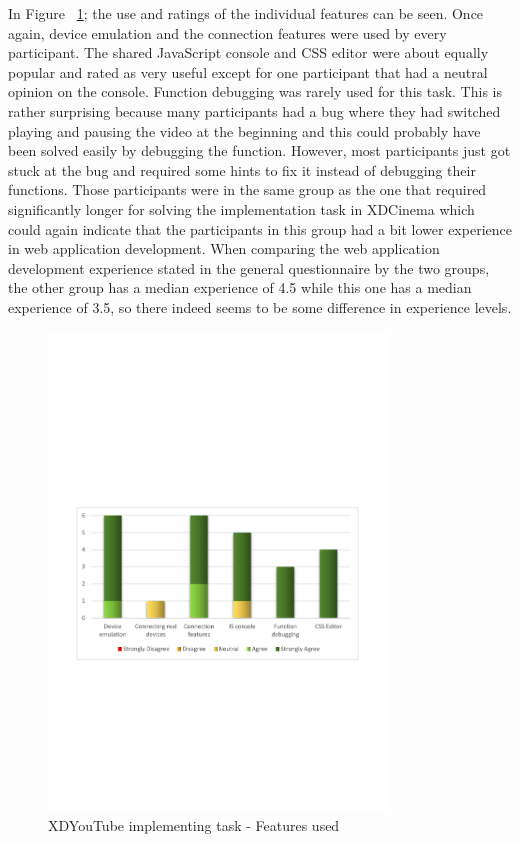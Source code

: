 In Figure ~\ref{fig:xdyt_impl_features_used}; the use and ratings of the individual features can be seen. Once again, device emulation and the connection features were used by every participant. The shared JavaScript console and CSS editor were about equally popular and rated as very useful except for one participant that had a neutral opinion on the console. Function debugging was rarely used for this task. This is rather surprising because many participants had a bug where they had switched playing and pausing the video at the beginning and this could probably have been solved easily by debugging the function. However, most participants just got stuck at the bug and required some hints to fix it instead of debugging their functions. Those participants were in the same group as the one that required significantly longer for solving the implementation task in XDCinema which could again indicate that the participants in this group had a bit lower experience in web application development. When comparing the web application development experience stated in the general questionnaire by the two groups, the other group has a median experience of 4.5 while this one has a median experience of 3.5, so there indeed seems to be some difference in experience levels.

\begin{figure}[H]
  \centering
    \includegraphics[width=0.8\textwidth]{images/charts/xdyt_impl_features_used.pdf}
	\caption{XDYouTube implementing task - Features used}
	\label{fig:xdyt_impl_features_used}
\end{figure}

